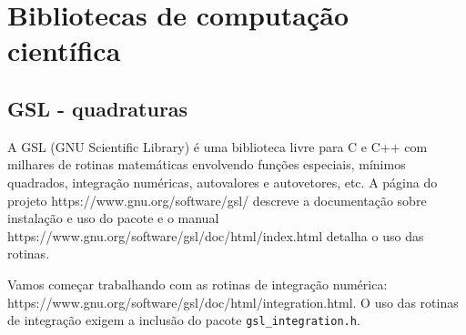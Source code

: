 \chapter{Bibliotecas de computação científica}

\section{GSL - quadraturas}
A GSL (GNU Scientific Library) é uma biblioteca livre para C e C++ com milhares de rotinas matemáticas envolvendo funções especiais, mínimos quadrados, integração numéricas, autovalores e autovetores, etc. A página do projeto  https://www.gnu.org/software/gsl/ descreve a documentação sobre instalação e uso do pacote e o manual https://www.gnu.org/software/gsl/doc/html/index.html detalha o uso das rotinas.

Vamos começar trabalhando com as rotinas de integração numérica: https://www.gnu.org/software/gsl/doc/html/integration.html. O uso das rotinas de integração exigem a inclusão do pacote \verb|gsl_integration.h|.

